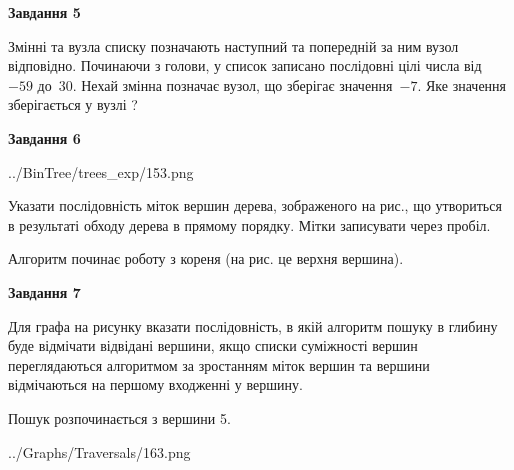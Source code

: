 \documentclass[12pt, ukrainian]{article}
\begin{document}
{\begin {large}
{\begin {center}\textbf{Завдання 5}\end {center}}\par
Змінні  та  вузла списку позначають наступний та попередній за ним вузол відповідно. Починаючи з голови, у список записано послідовні цілі числа від~$-59$ до~$30$. Нехай змінна  позначає вузол, що зберігає значення~$-7$.
Яке значення зберігається у вузлі  ?\par
\newpage

{\begin {center}\textbf{Завдання 6}\end {center}}\par

\begin{center}
	{../BinTree/trees_exp/153.png}
\end{center}
Указати послідовність міток вершин дерева, зображеного на рис., що утвориться в результаті обходу дерева в прямому порядку. Мітки записувати через пробіл.\par Алгоритм починає роботу з кореня (на рис. це верхня вершина).\par
\newpage

{\begin {center}\textbf{Завдання 7}\end {center}}\par
Для графа на рисунку вказати послідовність, в якій алгоритм пошуку в глибину буде відмічати відвідані вершини, якщо списки суміжності вершин переглядаються алгоритмом за зростанням міток вершин та вершини відмічаються на першому вход\-женні у вершину.\par
Пошук розпочинається з вершини 5.\par

\begin{center}
	{../Graphs/Traversals/163.png}
\end{center}\par
\newpage


\end{large}}
\end{document}
